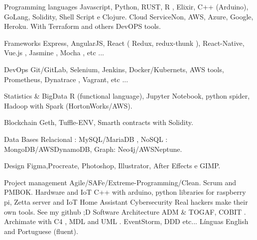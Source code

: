 \vspace{5mm}

\begin{cvskills}

  \cvskill
    {Programming languages} %
    {Javascript, Python, RUST, R , Elixir, C++ (Arduino), GoLang, Solidity, Shell Script e Clojure.} %
  \cvskill
    {Cloud} %
    { ServiceNon, AWS, Azure, Google, Heroku. With Terraform and others DevOPS tools.} %

  \cvskill
    {Frameworks} %
    {Express, AngularJS, React ( Redux, redux-thunk ), React-Native, Vue.js , Jasmine , Mocha ,  etc ...} %

\cvskill
    {DevOps} %
    {Git/GitLab, Selenium, Jenkins, Docker/Kubernets, AWS tools, Prometheus, Dynatrace , Vagrant, etc ...} %

 \cvskill
    {Statistics \& BigData} %
    { R (functional language), Jupyter Notebook, python spider, Hadoop with Spark (HortonWorks/AWS).
    } %

 \cvskill
    {Blockchain} %
    { Geth, Tuffle-ENV, Smarth contracts with Solidity.} %

 \cvskill
    {Data Bases} %
    {Relacional : MySQL/MariaDB , NoSQL : MongoDB/AWSDynamoDB, Graph: Neo4j/AWSNeptune.} %

 \cvskill
    {Design} %
    {Figma,Procreate, Photoshop, Illustrator, After Effects e GIMP.} %
    
 \cvskill
    {Project management} %
    {Agile/SAFe/Extreme-Programming/Clean. Scrum and PMBOK.} %
 \cvskill
    {Hardware and IoT} %
    { C++ with arduino, python libraries for raspberry pi, Zetta server and IoT Home Assistant} %
\cvskill
{Cybersecurity} %
{ Real hackers make their own tools. See my github ;D} %
\cvskill
{Software Architecture} %
{ ADM \& TOGAF, COBIT . Archimate with C4 , MDL and UML . EventStorm, DDD etc... } %
 \cvskill
 {Línguas} %
 { English and Portuguese (fluent).} %

\end{cvskills}
